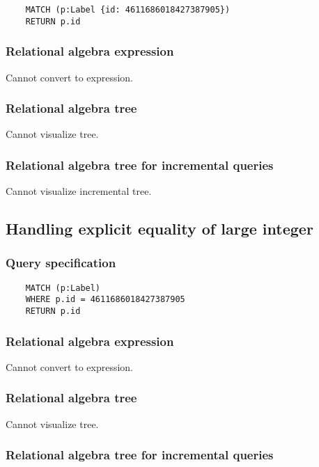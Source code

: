 	\begin{lstlisting}
	MATCH (p:Label {id: 4611686018427387905})
	RETURN p.id
	\end{lstlisting}


	\subsubsection*{Relational algebra expression}

	Cannot convert to expression.

	\subsubsection*{Relational algebra tree}

	Cannot visualize tree.

	\subsubsection*{Relational algebra tree for incremental queries}

	Cannot visualize incremental tree.
	\subsection{Handling explicit equality of large integer}

	\subsubsection*{Query specification}

	\begin{lstlisting}
	MATCH (p:Label)
	WHERE p.id = 4611686018427387905
	RETURN p.id
	\end{lstlisting}


	\subsubsection*{Relational algebra expression}

	Cannot convert to expression.

	\subsubsection*{Relational algebra tree}

	Cannot visualize tree.

	\subsubsection*{Relational algebra tree for incremental queries}

